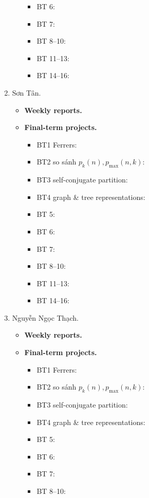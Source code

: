 \documentclass{article}
\begin{document}
\begin{enumerate}
\begin{itemize}
\begin{itemize}
            \item BT 6:
            \item BT 7:
            \item BT 8--10:
            \item BT 11--13:
            \item BT 14--16:
        \end{itemize}
    \end{itemize}
    \item {\sc Sơn Tân.}
    \begin{itemize}
        \item {\bf Weekly reports.}
        \item {\bf Final-term projects.}
        \begin{itemize}
            \item BT1 Ferrers:
            \item BT2 so sánh $p_k(n),p_{\max}(n,k)$:
            \item BT3 self-conjugate partition:
            \item BT4 graph \& tree representations:
            \item BT 5:
            \item BT 6:
            \item BT 7:
            \item BT 8--10:
            \item BT 11--13:
            \item BT 14--16:
        \end{itemize}
    \end{itemize}
    \item {\sc Nguyễn Ngọc Thạch.}
    \begin{itemize}
        \item {\bf Weekly reports.}
        \item {\bf Final-term projects.}
        \begin{itemize}
            \item BT1 Ferrers:
            \item BT2 so sánh $p_k(n),p_{\max}(n,k)$:
            \item BT3 self-conjugate partition:
            \item BT4 graph \& tree representations:
            \item BT 5:
            \item BT 6:
            \item BT 7:
            \item BT 8--10:

\end{itemize}
\end{itemize}
\end{enumerate}
\end{document}

